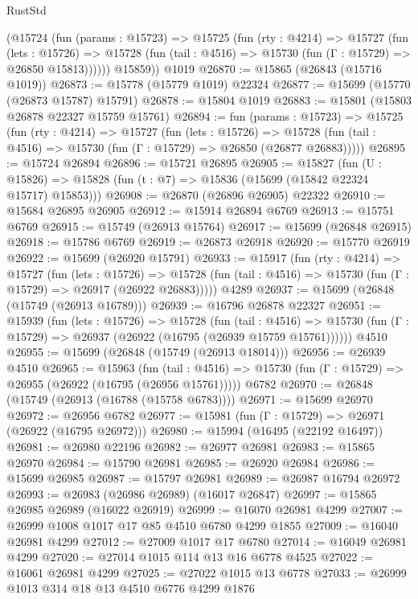 \begin{lexlean}{RustStd}
\begin{coremodule}
        (@15724
          (fun (params : @15723) =>
          @15725
            (fun (rty : @4214) =>
            @15727
              (fun (lets : @15726) =>
              @15728 (fun (tail : @4516) => @15730 (fun (Γ : @15729) => @26850 @15813))))))
        @15859))
    @1019
@26870 := @15865 (@26843 (@15716 @1019))
@26873 := @15778 (@15779 @1019) @22324
@26877 := @15699 (@15770 (@26873 @15787) @15791)
@26878 := @15804 @1019
@26883 := @15801 (@15803 @26878 @22327 @15759 @15761)
@26894 := fun (params : @15723) =>
  @15725
    (fun (rty : @4214) =>
    @15727
      (fun (lets : @15726) =>
      @15728 (fun (tail : @4516) => @15730 (fun (Γ : @15729) => @26850 (@26877 @26883)))))
@26895 := @15724 @26894
@26896 := @15721 @26895
@26905 := @15827
    (fun (U : @15826) => @15828 (fun (t : @7) => @15836 (@15699 (@15842 @22324 @15717) @15853)))
@26908 := @26870 (@26896 @26905) @22322
@26910 := @15684 @26895 @26905
@26912 := @15914 @26894 @6769
@26913 := @15751 @6769
@26915 := @15749 (@26913 @15764)
@26917 := @15699 (@26848 @26915)
@26918 := @15786 @6769
@26919 := @26873 @26918
@26920 := @15770 @26919
@26922 := @15699 (@26920 @15791)
@26933 := @15917
    (fun (rty : @4214) =>
    @15727
      (fun (lets : @15726) =>
      @15728 (fun (tail : @4516) => @15730 (fun (Γ : @15729) => @26917 (@26922 @26883)))))
    @4289
@26937 := @15699 (@26848 (@15749 (@26913 @16789)))
@26939 := @16796 @26878 @22327
@26951 := @15939
    (fun (lets : @15726) =>
    @15728
      (fun (tail : @4516) =>
      @15730 (fun (Γ : @15729) => @26937 (@26922 (@16795 (@26939 @15759 @15761))))))
    @4510
@26955 := @15699 (@26848 (@15749 (@26913 @18014)))
@26956 := @26939 @4510
@26965 := @15963
    (fun (tail : @4516) => @15730 (fun (Γ : @15729) => @26955 (@26922 (@16795 (@26956 @15761)))))
    @6782
@26970 := @26848 (@15749 (@26913 (@16788 (@15758 @6783))))
@26971 := @15699 @26970
@26972 := @26956 @6782
@26977 := @15981 (fun (Γ : @15729) => @26971 (@26922 (@16795 @26972)))
@26980 := @15994 (@16495 (@22192 @16497))
@26981 := @26980 @22196
@26982 := @26977 @26981
@26983 := @15865 @26970
@26984 := @15790 @26981
@26985 := @26920 @26984
@26986 := @15699 @26985
@26987 := @15797 @26981
@26989 := @26987 @16794 @26972
@26993 := @26983 (@26986 @26989) (@16017 @26847)
@26997 := @15865 @26985 @26989 (@16022 @26919)
@26999 := @16070 @26981 @4299
@27007 := @26999 @1008 @1017 @17 @85 @4510 @6780 @4299 @1855
@27009 := @16040 @26981 @4299
@27012 := @27009 @1017 @17 @6780
@27014 := @16049 @26981 @4299
@27020 := @27014 @1015 @114 @13 @16 @6778 @4525
@27022 := @16061 @26981 @4299
@27025 := @27022 @1015 @13 @6778
@27033 := @26999 @1013 @314 @18 @13 @4510 @6776 @4299 @1876

\end{coremodule}
\end{lexlean}
